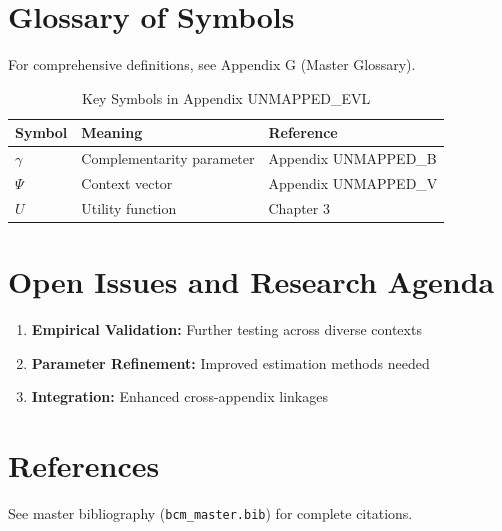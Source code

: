 \section{Glossary of Symbols}
\label{sec:evl-glossary}

For comprehensive definitions, see Appendix G (Master Glossary).

\begin{table}[htbp]
\centering
\caption{Key Symbols in Appendix UNMAPPED_EVL}
\begin{tabular}{lll}
\toprule
\textbf{Symbol} & \textbf{Meaning} & \textbf{Reference} \\
\midrule
$\gamma$ & Complementarity parameter & Appendix UNMAPPED_B \\
$\Psi$ & Context vector & Appendix UNMAPPED_V \\
$U$ & Utility function & Chapter 3 \\
\bottomrule
\end{tabular}
\end{table}



\section{Open Issues and Research Agenda}
\label{sec:evl-open}

\begin{enumerate}
    \item \textbf{Empirical Validation:} Further testing across diverse contexts
    \item \textbf{Parameter Refinement:} Improved estimation methods needed
    \item \textbf{Integration:} Enhanced cross-appendix linkages
\end{enumerate}

\section{References}
\label{sec:evl-references}

See master bibliography (\texttt{bcm\_master.bib}) for complete citations.

\nocite{bcm_master}

